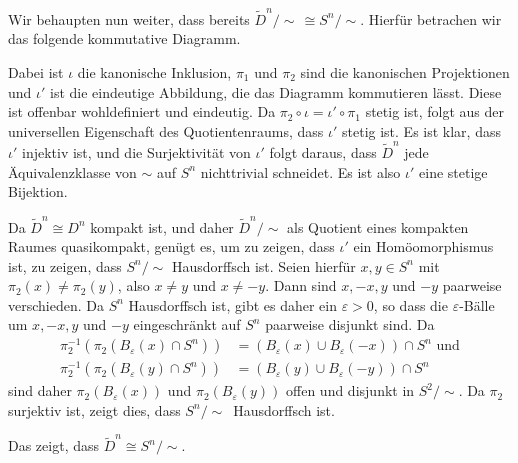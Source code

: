\documentclass[a4paper,10pt]{article}
\begin{document}
Wir behaupten nun weiter, dass bereits $\tilde{D}^n/\!\sim\, \cong S^n/\!\sim$. Hierfür betrachen wir das folgende kommutative Diagramm.
\begin{center}
\end{center}
Dabei ist $\iota$ die kanonische Inklusion, $\pi_1$ und $\pi_2$ sind die kanonischen Projektionen und $\iota'$ ist die eindeutige Abbildung, die das Diagramm kommutieren lässt. Diese ist offenbar wohldefiniert und eindeutig.
Da $\pi_2 \circ \iota = \iota' \circ \pi_1$ stetig ist, folgt aus der universellen Eigenschaft des Quotientenraums, dass $\iota'$ stetig ist. Es ist klar, dass $\iota'$ injektiv ist, und die Surjektivität von $\iota'$ folgt daraus, dass $\tilde{D}^n$ jede Äquivalenzklasse von $\sim$ auf $S^n$ nichttrivial schneidet. Es ist also $\iota'$ eine stetige Bijektion.

Da $\tilde{D}^n \cong D^n$ kompakt ist, und daher $\tilde{D}^n/\!\sim$ als Quotient eines kompakten Raumes quasikompakt, genügt es, um zu zeigen, dass $\iota'$ ein Homöomorphismus ist, zu zeigen, dass $S^n/\!\sim$ Hausdorffsch ist. Seien hierfür $x,y \in S^n$ mit $\pi_2(x) \neq \pi_2(y)$, also $x \neq y$ und $x \neq -y$. Dann sind $x, -x, y$ und $-y$ paarweise verschieden. Da $S^n$ Hausdorffsch ist, gibt es daher ein $\varepsilon > 0$, so dass die $\varepsilon$-Bälle um $x,-x,y$ und $-y$ eingeschränkt auf $S^n$ paarweise disjunkt sind. Da
\begin{align*}
 \pi_2^{-1}(\pi_2(B_\varepsilon(x) \cap S^n)) &= (B_\varepsilon(x) \cup B_\varepsilon(-x)) \cap S^n \text{ und} \\
 \pi_2^{-1}(\pi_2(B_\varepsilon(y) \cap S^n)) &= (B_\varepsilon(y) \cup B_\varepsilon(-y)) \cap S^n
\end{align*}
sind daher $\pi_2(B_\varepsilon(x))$ und $\pi_2(B_\varepsilon(y))$ offen und disjunkt in $S^2/\!\sim$. Da $\pi_2$ surjektiv ist, zeigt dies, dass $S^n/\!\sim\,$ Hausdorffsch ist.

Das zeigt, dass $\tilde{D}^n \cong S^n / \sim$.
\end{document}
